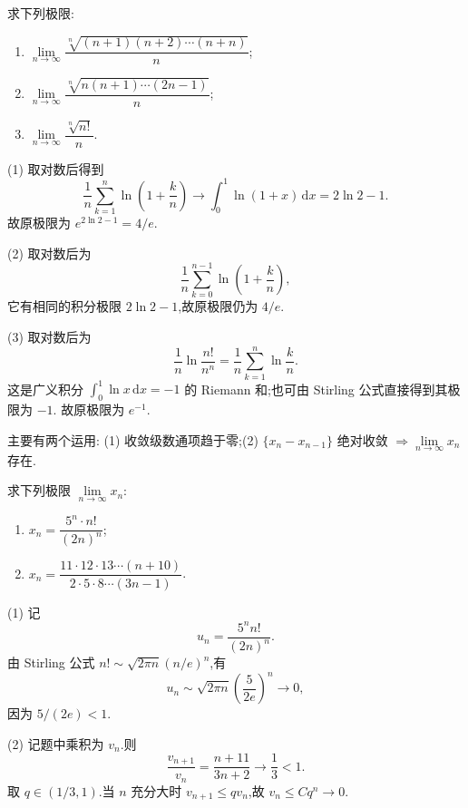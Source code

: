 \begin{example}
  求下列极限:
  \begin{enumerate}
    \item $\displaystyle
            \lim\limits_{n\to\infty}
            \dfrac{\sqrt[n]{(n+1)(n+2)\cdots(n+n)}}{n}$;
    \item $\displaystyle
            \lim\limits_{n\to\infty}
            \dfrac{\sqrt[n]{n(n+1)\cdots(2n-1)}}{n}$;
    \item $\displaystyle
            \lim\limits_{n\to\infty}\dfrac{\sqrt[n]{n!}}{n}$.
  \end{enumerate}
\end{example}
\exampleblank

\begin{solution}
  (1) 取对数后得到
  \[
    \dfrac{1}{n}\sum\limits_{k=1}^n\ln\left(1+\dfrac{k}{n}\right)
    \longrightarrow\int_0^1\ln(1+x)\,\mathrm{d}x=2\ln2-1.
  \]
  故原极限为 $e^{2\ln2-1}=4/e$.

  (2) 取对数后为
  \[
    \dfrac{1}{n}\sum\limits_{k=0}^{n-1}\ln\left(1+\dfrac{k}{n}\right),
  \]
  它有相同的积分极限 $2\ln2-1$,故原极限仍为 $4/e$.

  (3) 取对数后为
  \[
    \dfrac{1}{n}\ln\dfrac{n!}{n^n}
    =\dfrac{1}{n}\sum\limits_{k=1}^n\ln\dfrac{k}{n}.
  \]
  这是广义积分 $\displaystyle \int_0^1\ln x\,\mathrm{d}x=-1$ 的 Riemann 和;也可由 Stirling 公式直接得到其极限为 $-1$.
  故原极限为 $e^{-1}$.
\end{solution}




主要有两个运用: (1) 收敛级数通项趋于零;(2)
$\{x_n-x_{n-1}\}$ 绝对收敛 $\Rightarrow \displaystyle \lim\limits_{n\to\infty}x_n$ 存在.

\begin{example}
  求下列极限 $\displaystyle \lim\limits_{n\to\infty}x_n$:
  \begin{enumerate}
    \item $\displaystyle x_n=\dfrac{5^n\cdot n!}{(2n)^n}$;
    \item $\displaystyle x_n=\dfrac{11\cdot12\cdot13\cdots(n+10)}{2\cdot5\cdot8\cdots(3n-1)}$.
  \end{enumerate}
\end{example}
\exampleblank

\begin{solution}
  (1) 记
  \[
    u_n=\dfrac{5^n n!}{(2n)^n}.
  \]
  由 Stirling 公式 $n!\sim\sqrt{2\pi n}(n/e)^n$,有
  \[
    u_n\sim\sqrt{2\pi n}\left(\dfrac{5}{2e}\right)^n\longrightarrow0,
  \]
  因为 $5/(2e)<1$.

  (2) 记题中乘积为 $v_n$.则
  \[
    \dfrac{v_{n+1}}{v_n}=\dfrac{n+11}{3n+2}\longrightarrow\dfrac{1}{3}<1.
  \]
  取 $q\in(1/3,1)$.当 $n$ 充分大时 $v_{n+1}\leq qv_n$,故
  $v_n\leq Cq^n\to0$.
\end{solution}


